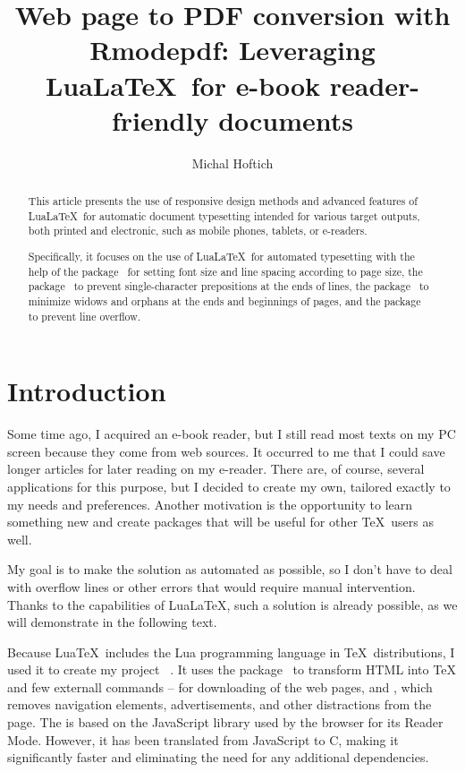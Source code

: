 \documentclass{ltugboat}
\title{Web page to PDF conversion with Rmodepdf: Leveraging Lua\LaTeX\ for e-book reader-friendly documents}
\author{Michal Hoftich}
\begin{document}
\maketitle

\begin{abstract}
This article presents the use of responsive design methods and advanced features
of Lua\LaTeX\ for automatic document typesetting intended for various target outputs,
both printed and electronic, such as mobile phones, tablets, or e-readers.

Specifically, it focuses on the use of Lua\LaTeX\ for automated
typesetting with the help of the  package~\cite{responsive}
for setting font size and line spacing according to page size, the
 package~\cite{luavlna} to prevent single-character
prepositions at the ends of lines, the 
package~\cite{lua-widow-control} to minimize widows and orphans at the ends and
beginnings of pages, and the  package~\cite{linebreaker} to
prevent line overflow.

\end{abstract}


\section{Introduction}

Some time ago, I acquired an e-book reader, but I still read most texts on my
PC screen because they come from web sources. It occurred to me that I could
save longer articles for later reading on my e-reader. There are, of course,
several applications for this purpose, but I decided to create my own, tailored
exactly to my needs and preferences. Another motivation is the opportunity to
learn something new and create packages that will be useful for other \TeX\
users as well.

My goal is to make the solution as automated as possible, so I don't have to
deal with overflow lines or other errors that would require manual
intervention. Thanks to the capabilities of Lua\LaTeX, such a solution is
already possible, as we will demonstrate in the following text.

Because Lua\TeX\ includes the Lua programming language in \TeX\ distributions,
I used it to create my project \tbcode{Rmodepdf}~\cite{rmodepdf}. It uses the
\tbcode{LuaXML} package~\cite{luaxml} to transform HTML into \TeX{} and few
externall commands -- \tbcode{Curl} for downloading of the web pages, 
and  \cite{rdrview}, which removes navigation
elements, advertisements, and other distractions from the page.
The \tbcode{Rdrview} is based on the JavaScript library used by the
\tbcode{Firefox} browser for its Reader Mode. However, it has been translated
from JavaScript to C, making it significantly faster and eliminating the need
for any additional dependencies.
\end{document}
